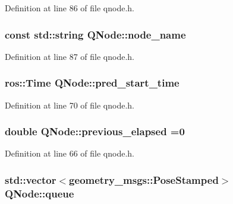 Definition at line 86 of file qnode.\+h.

\subsubsection[{\texorpdfstring{node\+\_\+name}{node_name}}]{\setlength{\rightskip}{0pt plus 5cm}const std\+::string Q\+Node\+::node\+\_\+name\hspace{0.3cm}{\ttfamily [protected]}}\hypertarget{class_q_node_ae2a04cf101323be1e9b2be1e63a03b7f}{}\label{class_q_node_ae2a04cf101323be1e9b2be1e63a03b7f}


Definition at line 87 of file qnode.\+h.

\subsubsection[{\texorpdfstring{pred\+\_\+start\+\_\+time}{pred_start_time}}]{\setlength{\rightskip}{0pt plus 5cm}ros\+::\+Time Q\+Node\+::pred\+\_\+start\+\_\+time}\hypertarget{class_q_node_aaac0b11e5a9902a566a9f952da85d5a5}{}\label{class_q_node_aaac0b11e5a9902a566a9f952da85d5a5}


Definition at line 70 of file qnode.\+h.

\subsubsection[{\texorpdfstring{previous\+\_\+elapsed}{previous_elapsed}}]{\setlength{\rightskip}{0pt plus 5cm}double Q\+Node\+::previous\+\_\+elapsed =0}\hypertarget{class_q_node_a4b5f0a40821fbb176de620cb5a3921f7}{}\label{class_q_node_a4b5f0a40821fbb176de620cb5a3921f7}


Definition at line 66 of file qnode.\+h.

\subsubsection[{\texorpdfstring{queue}{queue}}]{\setlength{\rightskip}{0pt plus 5cm}std\+::vector$<$geometry\+\_\+msgs\+::\+Pose\+Stamped$>$ Q\+Node\+::queue}\hypertarget{class_q_node_ae7dd0fd8218c767bfa1ff5ba837cd165}{}\label{class_q_node_ae7dd0fd8218c767bfa1ff5ba837cd165}


